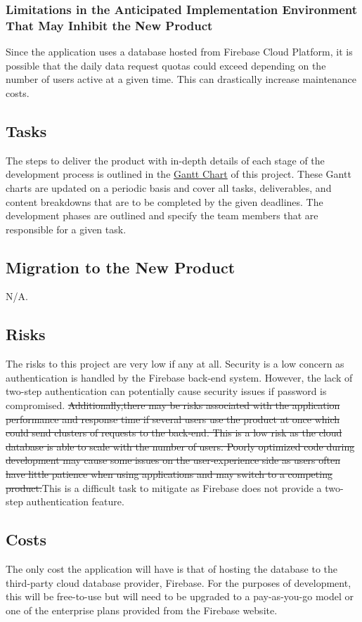 \documentclass[12pt, titlepage]{article}
\begin{document}
\subsubsection{Limitations in the Anticipated Implementation Environment That May Inhibit the New Product}
Since the application uses a database hosted from Firebase Cloud Platform, it is possible that the daily data request quotas could exceed depending on the number of users active at a given time. This can drastically increase maintenance costs.

\subsection{Tasks}
The steps to deliver the product with in-depth details of each stage of the development process is outlined in the \href{https://gitlab.cas.mcmaster.ca/zamana11/se3xa3-project/-/tree/master/ProjectSchedule)}{Gantt Chart} of this project. These Gantt charts are updated on a periodic basis and cover all tasks, deliverables, and content breakdowns that are to be completed by the given deadlines. The development phases are outlined and specify the team members that are responsible for a given task.

\subsection{Migration to the New Product}
N/A.
\subsection{Risks}
The risks to this project are very low if any at all. Security is a low concern as authentication is handled by the Firebase back-end system. However, the lack of two-step authentication can potentially cause security issues if password is compromised. \sout{Additionally,there may be risks associated with the application performance and response time if several users use the product at once which could send clusters of requests to the back-end. This is a low risk as the cloud database is able to scale with the number of users. Poorly optimized code during development may cause some issues on the user-experience side as users often have little patience when using applications and may switch to a competing product.}This is a difficult task to mitigate as Firebase does not provide a two-step authentication feature.

\subsection{Costs}
The only cost the application will have is that of hosting the database to the third-party cloud database provider, Firebase. For the purposes of development, this will be free-to-use but will need to be upgraded to a pay-as-you-go model or one of the enterprise plans provided from the Firebase website.
\end{document}
